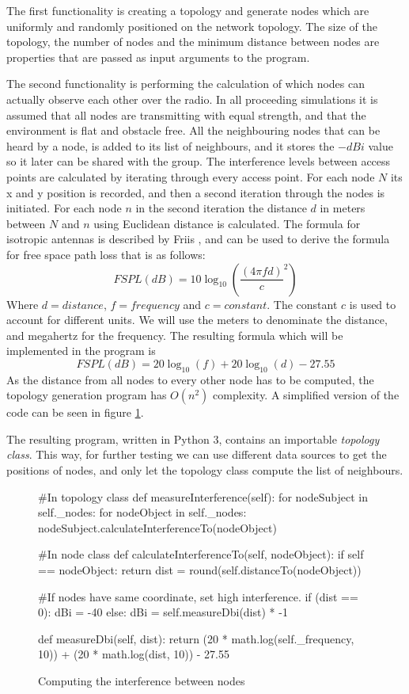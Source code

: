 	The first functionality is creating a topology and generate nodes which are uniformly
	and randomly positioned on the network topology. The size of the topology, the number of nodes and the minimum distance
	between nodes are properties that are passed as input arguments to the program.

	The second functionality is performing the calculation of which nodes can actually observe each other over the radio.
	In all proceeding simulations it is assumed that all nodes are transmitting with equal strength, and that the environment is flat and obstacle free. 
	All the neighbouring nodes that can be heard by a node, is added to its list of neighbours, and it stores the $-dBi$ value so it later can be shared with
	the group. The interference levels between access points are calculated by iterating through every access point. For each node $N$ its x and y position is recorded,
	and then a second iteration through the nodes is initiated. For each node $n$ in the second iteration the distance $d$ in
	meters between $N$ and $n$ using Euclidean distance is calculated. The formula for isotropic antennas is described by Friis \cite{Friis46}, and can be used to
	derive the formula for free space path loss \cite{FSPL} that is as follows:
\[
	FSPL(dB) = 10\log_{10} \left( \frac{ (4 \pi f d)}{c} ^2 \right) 
\]	
	Where $d = distance$, $f = frequency$ and $c=constant$. The constant $c$ is used to account for different units. We will use the meters to denominate the distance,
	and megahertz for the frequency. The resulting formula which will be implemented in the program is
\[
	FSPL(dB) = 20\log_{10}\left( f \right)  + 20\log_{10} \left(d\right) - 27.55
\]	
	As the distance from all nodes to every other node has to be computed, the topology generation program has $O(n^2)$ complexity. A simplified version of the code
	can be seen in figure \ref{fig:dbiCreation}. 

	The resulting program, written in Python 3\cite{Python3}, contains an importable \textit{topology class}. This way, for further testing we can use different data
	sources to get the positions of nodes, and only let the topology class compute the list of neighbours. 
	

	\begin{figure}[H]
		\begin{python}
#In topology class
def measureInterference(self):
 for nodeSubject in self._nodes:  
  for nodeObject in self._nodes:
    nodeSubject.calculateInterferenceTo(nodeObject) 

#In node class
def calculateInterferenceTo(self, nodeObject):
 if self == nodeObject:
  return
 dist = round(self.distanceTo(nodeObject))

#If  nodes have same coordinate, set high interference. 
 if (dist == 0):
  dBi = -40
 else:
  dBi  = self.measureDbi(dist) * -1

def measureDbi(self, dist):
 return (20 * math.log(self._frequency, 10)) + 
(20 * math.log(dist, 10)) - 27.55

			\end{python}
			\caption{Computing the interference between nodes}
			\label{fig:dbiCreation}
			\end{figure}

